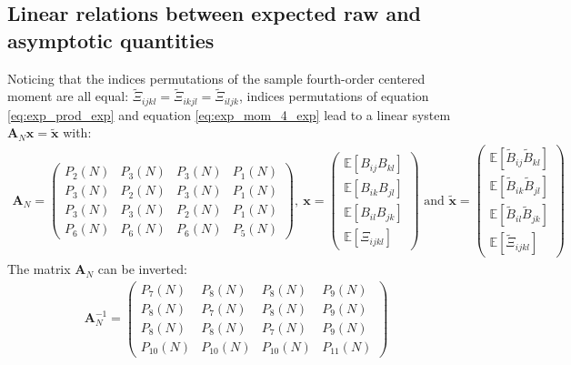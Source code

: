 \documentclass[12pt]{scrartcl}
\begin{document}
\subsection{Linear relations between expected raw and asymptotic quantities}
Noticing that the indices permutations of the sample fourth-order centered moment are all equal: $\widetilde{\Xi}_{ijkl} = \widetilde{\Xi}_{ikjl} = \widetilde{\Xi}_{iljk}$, indices permutations of equation \eqref{eq:exp_prod_exp} and equation \eqref{eq:exp_mom_4_exp} lead to a linear system $\mathbf{A}_N \mathbf{x} = \widetilde{\mathbf{x}}$ with:
\begin{align}
\mathbf{A}_N = \left( \begin{array}{cccc}
P_2(N) & P_3(N) & P_3(N) & P_1(N) \\
P_3(N) & P_2(N) & P_3(N) & P_1(N) \\
P_3(N) & P_3(N) & P_2(N) & P_1(N) \\
P_6(N) & P_6(N) & P_6(N) & P_5(N)
\end{array} \right) , \
\mathbf{x} = \left( \begin{array}{c}
\mathbb{E} \left[B_{ij} B_{kl}\right] \\
\mathbb{E} \left[B_{ik} B_{jl}\right] \\
\mathbb{E} \left[B_{il} B_{jk}\right] \\
\mathbb{E} \left[\Xi_{ijkl}\right]
\end{array} \right) \text{ and }
\widetilde{\mathbf{x}} = \left( \begin{array}{c}
\mathbb{E} \left[\widetilde{B}_{ij} \widetilde{B}_{kl}\right] \\
\mathbb{E} \left[\widetilde{B}_{ik} \widetilde{B}_{jl}\right] \\
\mathbb{E} \left[\widetilde{B}_{il} \widetilde{B}_{jk}\right] \\
\mathbb{E} \left[\widetilde{\Xi}_{ijkl}\right]
\end{array} \right) \nonumber
\end{align}
The matrix $\mathbf{A}_N$ can be inverted:
\begin{align}
\label{eq:invert_lin_sys}
\mathbf{A}_N^{-1} = \left( \begin{array}{cccc}
P_7(N) & P_8(N) & P_8(N) & P_9(N) \\
P_8(N) & P_7(N) & P_8(N) & P_9(N) \\
P_8(N) & P_8(N) & P_7(N) & P_9(N) \\
P_{10}(N) & P_{10}(N) & P_{10}(N) & P_{11}(N)
\end{array} \right)
\end{align}
\end{document}
